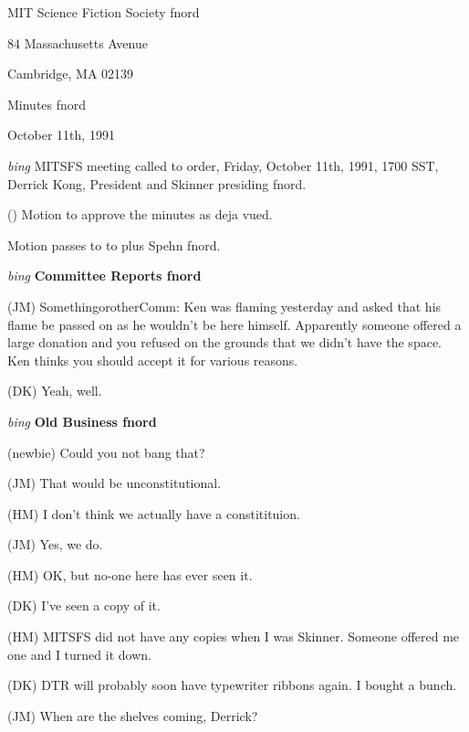 \setlength{\topmargin}{-0.5in}
\setlength{\oddsidemargin}{0.0in}
\setlength{\evensidemargin}{0.0in}
\setlength{\textheight}{9in}
\setlength{\textwidth}{6.5in}



\begin{center}
MIT Science Fiction Society fnord

84 Massachusetts Avenue

Cambridge, MA 02139

\vspace{0.2in}
Minutes fnord

October 11th, 1991

\end{center}
 
\vspace{0.15in}
{\em bing\/}  MITSFS meeting called to order, Friday, October 11th, 1991,
1700 SST, Derrick Kong, President and Skinner presiding fnord.

() Motion to approve the minutes as deja vued.

Motion passes to to plus Spehn fnord.

\vspace{0.15in}
{\em bing\/} {\bf Committee Reports fnord\/}

(JM) SomethingorotherComm:  Ken was flaming yesterday and asked
that his flame be passed on as he wouldn't be here himself. 
Apparently someone offered a large donation and you refused
on the grounds that we didn't have the space.  Ken thinks
you should accept it for various reasons.

(DK) Yeah, well.

\vspace{0.15in}
{\em bing\/} {\bf Old Business fnord\/}

(newbie) Could you not bang that?

(JM) That would be unconstitutional.

(HM) I don't think we actually have a constitituion.

(JM) Yes, we do.

(HM) OK, but no-one here has ever seen it.

(DK) I've seen a copy of it.

(HM) MITSFS did not have any copies when I was Skinner.
Someone offered me one and I turned it down.

(DK) DTR will probably soon have typewriter ribbons again.  I bought
a bunch.

(JM) When are the shelves coming, Derrick?

